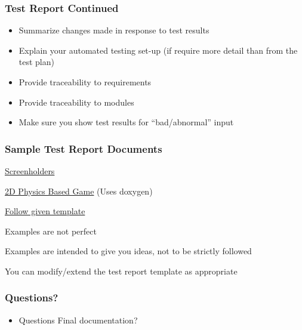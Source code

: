 \documentclass[t,12pt,numbers,fleqn]{beamer}
\begin{document}

\begin{frame}
\frametitle{Test Report Continued}
\begin{itemize}
\item Summarize changes made in response to test results
\item Explain your automated testing set-up (if require more detail than from
  the test plan)
\item Provide traceability to requirements
\item Provide traceability to modules
\item Make sure you show test results for ``bad/abnormal'' input
\end{itemize}
\end{frame}


\begin{frame}
\frametitle{Sample Test Report Documents} 

\bi
\item
  \href{https://gitlab.cas.mcmaster.ca/screenholders/screenholders}{Screenholders}
\item
  \href{https://github.com/palmerst/CS-4ZP6/tree/master}{2D Physics Based Game}
  (Uses doxygen)
\item
  \href{https://gitlab.cas.mcmaster.ca/smiths/cas741/tree/master/BlankProjectTemplate/Doc/TestReport}{Follow given template}
\item Examples are not perfect
\item Examples are intended to give you ideas, not to be strictly followed
\item You can modify/extend the test report template as appropriate
\ei

\end{frame}


\begin{frame}
\frametitle{Questions?}
\begin{itemize}
\item Questions Final documentation?
\end{itemize}
\end{frame}

\end{document}
